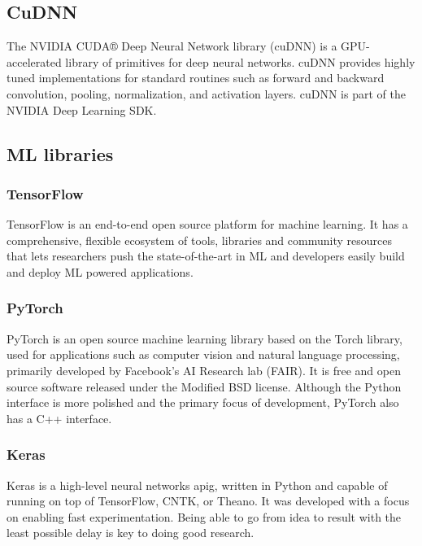 \subsection*{CuDNN}
\label{subsec:cudnn}
The NVIDIA CUDA® Deep Neural Network library (cuDNN) is a GPU-accelerated library
of primitives for deep neural networks. cuDNN provides highly tuned
implementations for standard routines such as forward and backward convolution,
pooling, normalization, and activation layers. cuDNN is part of the NVIDIA Deep
Learning SDK.

\subsection*{ML libraries}
\label{subsec:mllib}
\subsubsection*{TensorFlow}
\label{subsubsec:tensorflow}
TensorFlow is an end-to-end open source platform for machine learning. It has a
comprehensive, flexible ecosystem of tools, libraries and community resources
that lets researchers push the state-of-the-art in ML and developers easily
build and deploy ML powered applications.
\subsubsection*{PyTorch}
\label{subsubsec:pytorch}
PyTorch is an open source machine learning library based on the Torch library,
used for applications such as computer vision and natural language processing,
primarily developed by Facebook's AI Research lab (FAIR). It is free and open
source software released under the Modified BSD license. Although the Python
interface is more polished and the primary focus of development, PyTorch also
has a C++ interface.
\subsubsection*{Keras}
\label{subsubsec:keras}
Keras is a high-level neural networks \gls{apig}, written in Python and capable of
running on top of TensorFlow, CNTK, or Theano. It was developed with a focus on
enabling fast experimentation. Being able to go from idea to result with the
least possible delay is key to doing good research.
